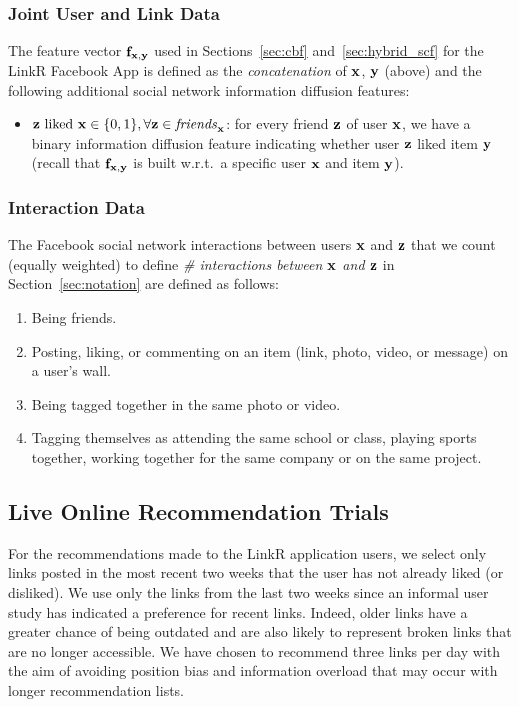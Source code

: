 \subsubsection{Joint User and Link Data}

\label{sec:fxy_def}

The feature vector $\mathbf{f}_{\mathbf{x},\mathbf{y}}$ used in Sections~\ref{sec:cbf}
and~\ref{sec:hybrid_scf} for the LinkR Facebook App is defined as the
\emph{concatenation} of $\mathbf{x}$, $\mathbf{y}$ (above) and the following
additional social network information diffusion features:
\begin{itemize}
\item $\mbox{$\mathbf{z}$ liked $\mathbf{x}$} \in \{0, 1\}, \forall \mathbf{z} \in \mathit{friends}_{\mathbf{x}}$: for every friend $\mathbf{z}$ of user $\mathbf{x}$, we have a binary information diffusion  feature indicating whether user $\mathbf{z}$ liked item $\mathbf{y}$ (recall that $\mathbf{f}_{\mathbf{x},\mathbf{y}}$ is built w.r.t.\ a specific user $\mathbf{x}$ and item $\mathbf{y}$).
\end{itemize}

\subsubsection{Interaction Data}
\label{sec:interactions}

The Facebook social network interactions between users $\mathbf{x}$ and $\mathbf{z}$ that we count
(equally weighted) to define
\emph{\# interactions between $\mathbf{x}$ and $\mathbf{z}$} in Section~\ref{sec:notation} 
are defined as follows:
\begin{enumerate}
\item{Being friends.}
\item{Posting, liking, or commenting on an item (link, photo, video, or message) on a user's wall.}
\item{Being tagged together in the same photo or video.}
\item{Tagging themselves as attending the same school or class, playing sports together, working together for the same company or on the same project.}
\end{enumerate}

\subsection{Live Online Recommendation Trials}

For the recommendations made to the LinkR application users, we select
only links posted in the most recent two weeks that the user has not
already liked (or disliked).  We use only the links from the last two
weeks since an informal user study has indicated a preference for
recent links.  Indeed, older links have a greater chance of being
outdated and are also likely to represent broken links that are no longer
accessible.  We have chosen to recommend three links per day
with the aim of avoiding position bias and information overload that
may occur with longer recommendation lists.

